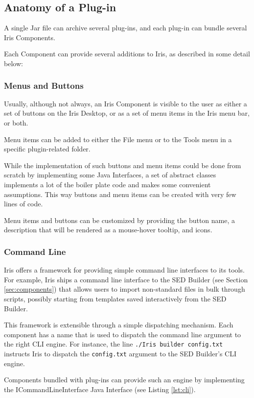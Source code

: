 \documentclass[preprint,12pt,3p]{elsarticle}
\begin{document}
\subsection{Anatomy of a Plug-in}
A single Jar file can archive several plug-ins, and each plug-in can bundle several Iris Components.

Each Component can provide several additions to Iris, as described in some detail below:

\subsubsection{Menus and Buttons}
Usually, although not always, an Iris Component is visible to the user as either a set of buttons on the Iris Desktop, or as a set of menu items in the Iris menu bar, or both.

Menu items can be added to either the File menu or to the Tools menu in a specific plugin-related folder.

While the implementation of such buttons and menu items could be done from scratch by implementing some Java Interfaces, a set of abstract classes implements a lot of the boiler plate code and makes some convenient assumptions. This way buttons and menu items can be created with very few lines of code.

Menu items and buttons can be customized by providing the button name, a description that will be rendered as a mouse-hover tooltip, and icons.

\subsubsection{Command Line}
Iris offers a framework for providing simple command line interfaces to its tools. For example, Iris ships a command line interface to the SED Builder (see Section \ref{sec:components}) that allows users to import non-standard files in bulk through scripts, possibly starting from templates saved interactively from the SED Builder.

This framework is extensible through a simple dispatching mechanism. Each component has a name that is used to dispatch the command line argument to the right CLI engine. For instance, the line \verb|./Iris builder config.txt| instructs Iris to dispatch the \verb|config.txt| argument to the SED Builder's CLI engine.

Components bundled with plug-ins can provide such an engine by implementing the ICommandLineInterface Java Interface (see Listing \ref{lst:cli}).
\end{document}
